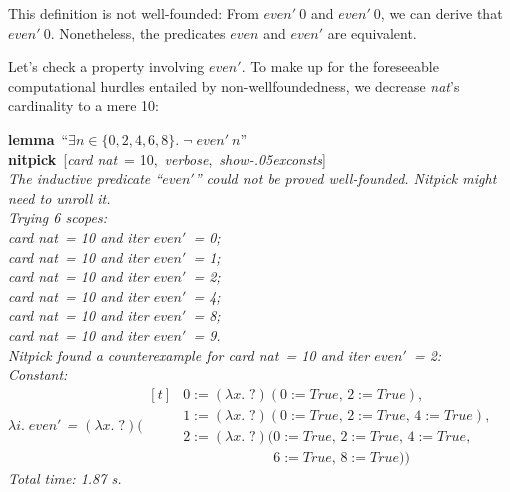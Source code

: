 \documentclass[a4paper,12pt]{article}
\def\unk{{?}}
\def\unkef{(\lambda x.\; \unk)}
\renewcommand\_{\hbox{\textunderscore\kern-.05ex}}
\begin{document}
This definition is not well-founded: From $\textit{even}'~0$ and
$\textit{even}'~0$, we can derive that $\textit{even}'~0$. Nonetheless, the
predicates $\textit{even}$ and $\textit{even}'$ are equivalent.

Let's check a property involving $\textit{even}'$. To make up for the
foreseeable computational hurdles entailed by non-wellfoundedness, we decrease
\textit{nat}'s cardinality to a mere 10:

\prew
\textbf{lemma}~``$\exists n \in \{0, 2, 4, 6, 8\}.\;
\lnot\;\textit{even}'~n$'' \\
\textbf{nitpick}~[\textit{card nat}~= 10,\, \textit{verbose},\, \textit{show\_consts}] \\[2\smallskipamount]
\slshape
The inductive predicate ``$\textit{even}'\!$'' could not be proved well-founded.
Nitpick might need to unroll it. \\[2\smallskipamount]
Trying 6 scopes: \\
\hbox{}\qquad \textit{card nat}~= 10 and \textit{iter} $\textit{even}'$~= 0; \\
\hbox{}\qquad \textit{card nat}~= 10 and \textit{iter} $\textit{even}'$~= 1; \\
\hbox{}\qquad \textit{card nat}~= 10 and \textit{iter} $\textit{even}'$~= 2; \\
\hbox{}\qquad \textit{card nat}~= 10 and \textit{iter} $\textit{even}'$~= 4; \\
\hbox{}\qquad \textit{card nat}~= 10 and \textit{iter} $\textit{even}'$~= 8; \\
\hbox{}\qquad \textit{card nat}~= 10 and \textit{iter} $\textit{even}'$~= 9. \\[2\smallskipamount]
Nitpick found a counterexample for \textit{card nat}~= 10 and \textit{iter} $\textit{even}'$~= 2: \\[2\smallskipamount]
\hbox{}\qquad Constant: \nopagebreak \\
\hbox{}\qquad\qquad $\lambda i.\; \textit{even}'$ = $\unkef(\!\begin{aligned}[t]
& 0 := \unkef(0 := \textit{True},\, 2 := \textit{True}),\, \\[-2pt]
& 1 := \unkef(0 := \textit{True},\, 2 := \textit{True},\, 4 := \textit{True}),\, \\[-2pt]
& 2 := \unkef(0 := \textit{True},\, 2 := \textit{True},\, 4 := \textit{True},\, \\[-2pt]
& \phantom{2 := \unkef(}6 := \textit{True},\, 8 := \textit{True}))\end{aligned}$ \\[2\smallskipamount]
Total time: 1.87 s.
\postw
\end{document}
